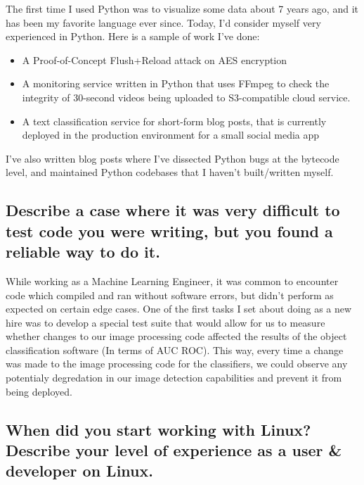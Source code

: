 \documentclass{article}
\begin{document}
The first time I used Python was to visualize some data about 7 years ago,
and it has been my favorite language ever since. Today, I'd consider myself
very experienced in Python. Here is a sample of work I've done:
\begin{itemize}
  \item A Proof-of-Concept Flush+Reload attack on AES encryption
  \item A monitoring service written in Python that uses FFmpeg to check the
        integrity of 30-second videos being uploaded to S3-compatible cloud service.
  \item A text classification service for short-form blog posts, that is
        currently deployed in the production environment for a small social media app
\end{itemize}

I've also written blog posts where I've dissected Python bugs at the bytecode
level, and maintained Python codebases that I haven't built/written
myself.

\subsection{Describe a case where it was very difficult to test code you were
  writing, but you found a reliable way to do it.}

While working as a Machine Learning Engineer, it was common to encounter
code which compiled and ran without software errors, but didn't perform as
expected on certain edge cases. One of the first tasks I set about doing as a
new hire was to develop a special test suite that would allow for us to measure
whether changes to our image processing code affected the results of the object
classification software (In terms of AUC ROC\cite{auc_roc}). This way, every
time a change was made to the image processing code for the classifiers, we could
observe any potentialy degredation in our image detection capabilities and prevent
it from being deployed.

\subsection{When did you start working with Linux? Describe your level of
  experience as a user \& developer on Linux.}
\end{document}
